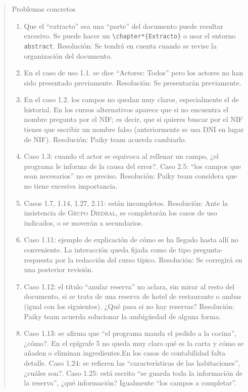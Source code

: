 \documentclass[11pt, a4paper, twoside]{report}
\begin{document}
\begin{quotation}
			\medskip
			Problemas concretos
			\begin{enumerate}
				\item Que el ``extracto'' sea una ``parte'' del documento puede resultar excesivo. Se puede hacer un \verb|\chapter*{Extracto}| o usar el entorno \verb|abstract|.
			Resolución: Se tendrá en cuenta cuando se revise la organización del documento.
				\item En el caso de uso 1.1. se dice ``Actores: Todos'' pero los actores no han sido presentado previamente.
			Resolución: Se presentarán previamente.
				\item En el caso 1.2. los campos no quedan muy claros, especialmente el de historial. En los cursos alternativos aparece que si no encuentra el nombre pregunta por el NIF; es decir, que si quieres buscar por el NIF tienes que escribir un nombre 				falso (anteriormente se usa DNI en lugar de NIF).
			Resolución: Paiky team acuerda cambiarlo.
				\item Caso 1.3: cuando el actor se equivoca al rellenar un campo, ¿el programa le informa de la causa del error?. Caso 2.5: ``los campos que sean necesarios'' no es preciso.
			Resolución: Paiky team considera que no tiene excesiva importancia.
				\item Casos 1.7, 1.14, 1.27, 2.11: están incompletos.
			Resolución: Ante la insistencia de  \textsc{Grupo Diedral}, se completarán los casos de uso indicados, o se moverán a secundarios.
				\item Caso 1.11: ejemplo de explicación de cómo se ha llegado hasta allí no conveniente. La interacción queda fijada como de tipo pregunta-respuesta por la redacción del curso típico.
			Resolución: Se corregirá en una posterior revisión.
				\item Caso 1.12: el título ``anular reserva'' no aclara, sin mirar al resto del documento, si se trata de una reserva de hotel de restaurante o ambas (igual con los siguientes). ¿Qué pasa si no hay reservas?
			Resolución: Paiky team acuerda solucionar la ambigüedad de alguna forma.
				\item Caso 1.13: se afirma que ``el programa manda el pedido a la cocina'', ¿cómo?. En el epígrafe 5 no queda muy claro qué es la carta y cómo se añaden o eliminan ingredientes.En los casos de contabilidad falta detalle.
			Caso 1.24: se refieren las ``características de las habitaciones'', ¿cuáles son?. Caso 1.25: está escrito ``se guarda toda la información de la reserva'', ¿qué información? Igualmente ``los campos a completar''.

\end{enumerate}
\end{quotation}
\end{document}
